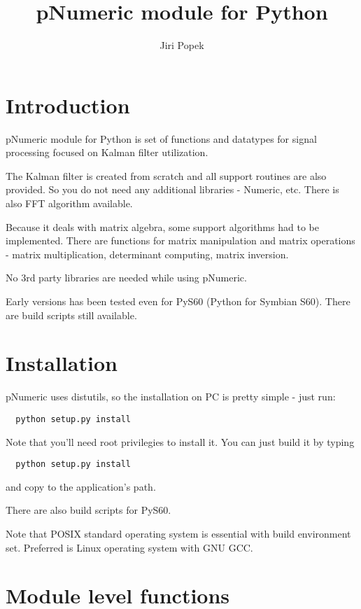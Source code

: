 \documentclass{article}
\title{pNumeric module for Python}
\author{Jiri Popek}
\begin{document}
\maketitle

\section{Introduction \label{intro}}
    pNumeric module for Python is set of functions and datatypes for signal
    processing focused on Kalman filter utilization.

    The Kalman filter is created from scratch and all support routines are
    also provided. So you do not need any additional libraries - Numeric, 
    etc. There is also FFT algorithm available.
  
    Because it deals with matrix algebra, some support algorithms had to be implemented. 
    There are functions for matrix manipulation and matrix operations - matrix
    multiplication, determinant computing, matrix inversion.
    
    No 3rd party libraries are needed while using pNumeric.
    
    Early versions has been tested even for PyS60 (Python for Symbian S60). There are build scripts
    still available.


\section{Installation \label{installation}}
  pNumeric uses distutils, so the installation on PC is pretty simple - just
  run:
  
  \begin{verbatim}
  python setup.py install
  \end{verbatim}
  
  Note that you'll need root privilegies to install it.
  You can just build it by typing
  
  \begin{verbatim}
  python setup.py install
  \end{verbatim}
  
  and copy  to the application's path.
  
  There are also build scripts for PyS60.

  Note that POSIX standard operating system is essential with build environment set.
  Preferred is Linux operating system with GNU GCC.


\section{Module level functions \label{modulefuncts}}
    
\end{document}
